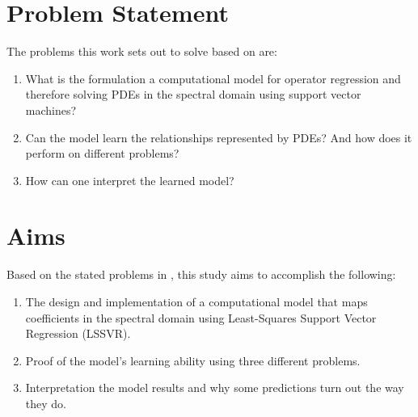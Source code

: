 \section{Problem Statement}\label{sec:problem_statement}
\noindent The problems this work sets out to solve based on  are:
\begin{enumerate}
    \item What is the formulation a computational model for operator regression and therefore solving PDEs in the spectral domain using support vector machines?
    \item Can the model learn the relationships represented by PDEs? And how does it perform on different problems?
    \item How can one interpret the learned model?
\end{enumerate}




\section{Aims}\label{sec:aims}
\noindent Based on the stated problems in , this study aims to accomplish the following:
\begin{enumerate}
    \item The design and implementation of a computational model that maps coefficients in the spectral domain using Least-Squares Support Vector Regression (LSSVR).
    \item Proof of the model's learning ability using three different problems.
    \item Interpretation the model results and why some predictions turn out the way they do.
\end{enumerate}

